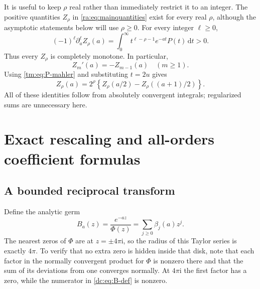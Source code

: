 \documentclass[11pt,a4paper,oneside,openany]{book}
\numberwithin{equation}{chapter}
\theoremstyle{definition}
\theoremstyle{remark}
\newcommand{\dd}{\,\mathrm d}
\newcommand{\ii}{\mathrm i}
\begin{document}
It is useful to keep $\rho$ real rather than immediately restrict it to an
integer. The positive quantities $Z_\rho$ in
\eqref{ra:eq:mainquantities} exist for every real $\rho$, although the
asymptotic statements below will use $\rho\ge0$.
For every integer $\ell\ge0$,
\begin{equation}\label{ra:eq:cmderivatives}
 (-1)^\ell\partial_a^\ell Z_\rho(a)
  =\int_0^\infty t^{\ell-\rho-1}e^{-at}P(t)\dd t>0.
\end{equation}
Thus every $Z_\rho$ is completely monotone. In particular,
\begin{equation}\label{ra:eq:ladder}
 Z_m'(a)=-Z_{m-1}(a)\quad(m\ge1).
\end{equation}
Using \eqref{tm:eq:P-mahler} and substituting $t=2u$ gives
\begin{equation}\label{ra:eq:Crhodyadic}
 Z_\rho(a)=2^\rho\left\{Z_\rho(a/2)-Z_\rho((a+1)/2)\right\}.
\end{equation}
All of these identities follow from absolutely convergent integrals;
regularized sums are unnecessary here.
\chapter{Exact rescaling and all-orders coefficient formulas}
\label{dc:sec:scaling}

\section{A bounded reciprocal transform}
Define the analytic germ
\begin{equation}
 B_a(z)=\frac{e^{-az}}{\Phi(z)}=\sum_{j\ge0}\beta_j(a)z^j.
 \label{dc:eq:B-def}
\end{equation}
The nearest zeros of $\Phi$ are at $z=\pm4\pi\ii$, so the radius
of this Taylor series is exactly $4\pi$. To verify that no extra zero
is hidden inside that disk, note that each factor in the normally
convergent product for $\Phi$ is nonzero there and that the sum of
its deviations from one converges normally. At $4\pi\ii$ the first
factor has a zero, while the numerator in \cref{dc:eq:B-def} is
nonzero.
\end{document}
